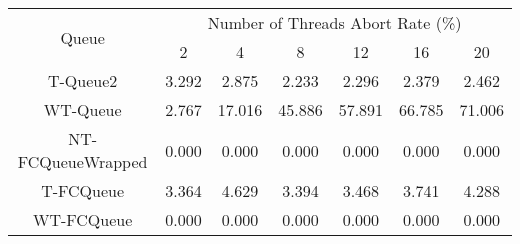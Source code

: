 \begin{tabular}{|c|c|c|c|c|c|c|}
\hline
\multirow{2}{*}{Queue} & \multicolumn{6}{c|}{Number of Threads Abort Rate (\%)}\\\cline{2-7}& 2 & 4 & 8 & 12 & 16 & 20\\
\hline
\hline
T-Queue2 & 3.292 & 2.875 & 2.233 & 2.296 & 2.379 & 2.462\\
WT-Queue & 2.767 & 17.016 & 45.886 & 57.891 & 66.785 & 71.006\\
NT-FCQueueWrapped & 0.000 & 0.000 & 0.000 & 0.000 & 0.000 & 0.000\\
T-FCQueue & 3.364 & 4.629 & 3.394 & 3.468 & 3.741 & 4.288\\
WT-FCQueue & 0.000 & 0.000 & 0.000 & 0.000 & 0.000 & 0.000\\
\hline\end{tabular}
